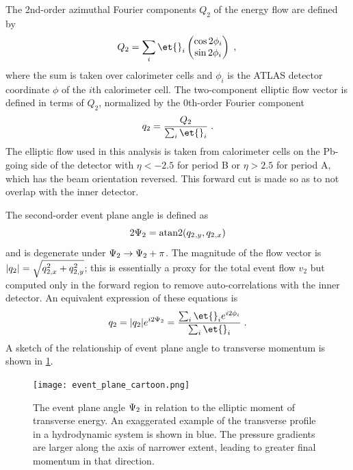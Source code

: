 The 2nd-order azimuthal Fourier components $Q_2$ of the energy flow are defined by
\begin{equation}
  Q_2 = \sum_{i}  \et{}_i \begin{pmatrix} \cos 2\phi_i \\ \sin 2\phi_i \end{pmatrix} \; ,\\
\end{equation}
where the sum is taken over calorimeter cells and $\phi_i$ is the ATLAS detector coordinate $\phi$ of the $i$th calorimeter cell.
The two-component elliptic flow vector \qt is defined in terms of $Q_2$, normalized by the 0th-order Fourier component
\begin{equation}
  \qt = \frac{Q_2}{\sum_i \et{}_i } \; .\\
\end{equation}
The elliptic flow used in this analysis is taken from calorimeter cells on the Pb-going side of the detector with $\eta < -2.5$ for period B or $\eta > 2.5$ for period A, which has the beam orientation reversed.
This forward cut is made so as to not overlap with the inner detector.

The second-order event plane angle \psit is defined as
\begin{equation}
2\Psi_{2} = \mathrm{atan2}(q_{2}{}_{,y},q_{2}{}_{,x})
\end{equation}
and is degenerate under $\Psi_{2} \rightarrow \Psi_{2} + \pi$.
The magnitude of the flow vector is $|q_{2}| = \sqrt{q_{2,x}^2 + q_{2,y}^2}$; this is essentially a proxy for the total event flow $v_2$ but computed only in the forward region to remove auto-correlations with the inner detector.
An equivalent expression of these equations is
\begin{equation}
\qt = |\qt| e^{i2\psit} = \frac{\sum_i \et{}_i e^{i2\phi_i}}{\sum_i \et{}_i} \; .
\end{equation}
A sketch of the relationship of event plane angle to transverse momentum is shown in \cref{fig:ep_cartoon}.

\begin{figure}[t]
  \centering
  \texttt{[image: event\_plane\_cartoon.png]}
  \caption{The event plane angle $\Psi_{2}$ in relation to the elliptic moment of transverse energy. An exaggerated example of the transverse profile in a hydrodynamic system is shown in blue. The pressure gradients are larger along the axis of narrower extent, leading to greater final momentum in that direction.}
\label{fig:ep_cartoon}
\end{figure}

